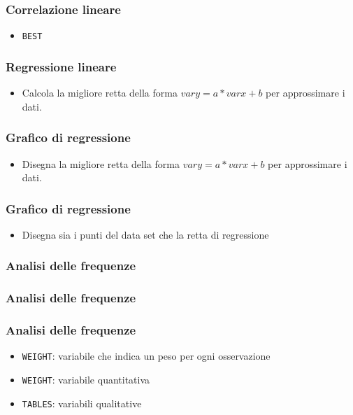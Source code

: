\begin{frame}[containsverbatim]\frametitle{Correlazione lineare}
  \begin{itemize}
  \item
    \verb!BEST!
  \end{itemize}
\end{frame}





\begin{frame}[containsverbatim]\frametitle{Regressione lineare}
  \begin{itemize}
  \item
    Calcola la migliore retta della forma $vary=a*varx+b$ per approssimare
    i dati.
  \end{itemize}
\end{frame}

\begin{frame}[containsverbatim]\frametitle{Grafico di regressione}
  \begin{itemize}
  \item
    Disegna la migliore retta della forma $vary=a*varx+b$ per approssimare
    i dati.
  \end{itemize}
\end{frame}

\begin{frame}[containsverbatim]\frametitle{Grafico di regressione}
  \begin{itemize}
  \item
    Disegna sia i punti del data set che la retta di regressione
  \end{itemize}
\end{frame}




\begin{frame}[containsverbatim]\frametitle{Analisi delle frequenze}
\end{frame}


\begin{frame}[containsverbatim]\frametitle{Analisi delle frequenze}
\end{frame}

\begin{frame}[containsverbatim]\frametitle{Analisi delle frequenze}
  \begin{itemize}
  \item
    \verb+WEIGHT+: variabile che indica un peso per ogni osservazione
  \item
    \verb+WEIGHT+: variabile quantitativa
  \item
    \verb+TABLES+: variabili qualitative
  \end{itemize}
\end{frame}


